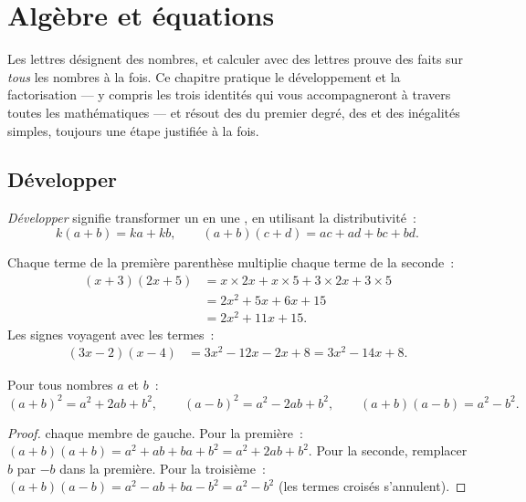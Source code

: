 \chapter{Algèbre et équations}\label{ch:g9:algebra}

Les lettres désignent des nombres, et calculer avec des lettres prouve
des faits sur \emph{tous} les nombres à la fois. Ce chapitre pratique le
développement et la factorisation --- y compris les trois identités qui
vous accompagneront à travers toutes les mathématiques --- et résout des
 du premier degré, des  et des inégalités
simples, toujours une étape justifiée à la fois.

\section{Développer}

\begin{definition}[Développer]\label{def:g9:algebra:expand}
\emph{Développer} signifie transformer un  en
une , en utilisant la distributivité~:
\[
k(a + b) = ka + kb,
\qquad
(a + b)(c + d) = ac + ad + bc + bd .
\]
\end{definition}

\begin{example}\label{ex:g9:algebra:expand}
Chaque terme de la première parenthèse multiplie chaque terme de la
seconde~:
\begin{align*}
(x + 3)(2x + 5)
&= x \times 2x + x \times 5 + 3 \times 2x + 3 \times 5 \\
&= 2x^2 + 5x + 6x + 15 \\
&= 2x^2 + 11x + 15 .
\end{align*}
Les signes voyagent avec les termes~:
\begin{align*}
(3x - 2)(x - 4)
&= 3x^2 - 12x - 2x + 8
= 3x^2 - 14x + 8 .
\end{align*}
\end{example}

\begin{theorem}\label{thm:g9:algebra:identities}
Pour tous nombres $a$ et $b$~:
\[
(a+b)^2 = a^2 + 2ab + b^2,
\qquad
(a-b)^2 = a^2 - 2ab + b^2,
\qquad
(a+b)(a-b) = a^2 - b^2 .
\]
\end{theorem}

\begin{proof}
 chaque membre de gauche. Pour la première~:
$(a+b)(a+b) = a^2 + ab + ba + b^2 = a^2 + 2ab + b^2$. Pour la seconde,
remplacer $b$ par $-b$ dans la première. Pour la troisième~:
$(a+b)(a-b) = a^2 - ab + ba - b^2 = a^2 - b^2$ (les termes croisés
s'annulent).
\end{proof}


